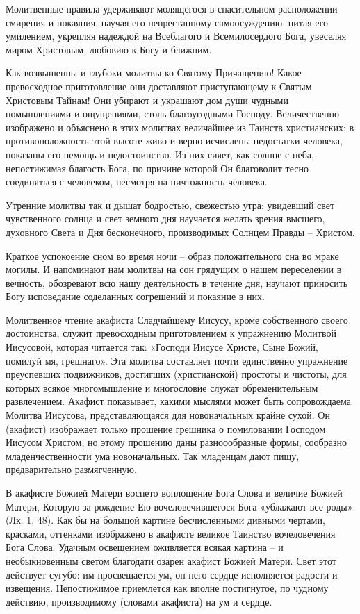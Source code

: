 Молитвенные правила удерживают молящегося в спасительном расположении смирения и покаяния, научая его непрестанному самоосуждению, питая его умилением, укрепляя надеждой на Всеблагого и Всемилосердого Бога, увеселяя миром Христовым, любовию к Богу и ближним.

Как возвышенны и глубоки молитвы ко Святому Причащению! Какое превосходное приготовление они доставляют приступающему к Святым Христовым Тайнам! Они убирают и украшают дом души чудными помышлениями и ощущениями, столь благоугодными Господу. Величественно изображено и объяснено в этих молитвах величайшее из Таинств христианских; в противоположность этой высоте живо и верно исчислены недостатки человека, показаны его немощь и недостоинство. Из них сияет, как солнце с неба, непостижимая благость Бога, по причине которой Он благоволит тесно соединяться с человеком, несмотря на ничтожность человека.

Утренние молитвы так и дышат бодростью, свежестью утра: увидевший свет чувственного солнца и свет земного дня научается желать зрения высшего, духовного Света и Дня бесконечного, производимых Солнцем Правды – Христом.

Краткое успокоение сном во время ночи – образ положительного сна во мраке могилы. И напоминают нам молитвы на сон грядущим о нашем переселении в вечность, обозревают всю нашу деятельность в течение дня, научают приносить Богу исповедание соделанных согрешений и покаяние в них.

Молитвенное чтение акафиста Сладчайшему Иисусу, кроме собственного своего достоинства, служит превосходным приготовлением к упражнению Молитвой Иисусовой, которая читается так: «Господи Иисусе Христе, Сыне Божий, помилуй мя, грешнаго». Эта молитва составляет почти единственно упражнение преуспевших подвижников, достигших (христианской) простоты и чистоты, для которых всякое многомышление и многословие служат обременительным развлечением. Акафист показывает, какими мыслями может быть сопровождаема Молитва Иисусова, представляющаяся для новоначальных крайне сухой. Он (акафист) изображает только прошение грешника о помиловании Господом Иисусом Христом, но этому прошению даны разноообразные формы, сообразно младенчественности ума новоначальных. Так младенцам дают пищу, предварительно размягченную.

В акафисте Божией Матери воспето воплощение Бога Слова и величие Божией Матери, Которую за рождение Ею вочеловечившегося Бога «ублажают все роды» (Лк. 1, 48). Как бы на большой картине бесчисленными дивными чертами, красками, оттенками изображено в акафисте великое Таинство вочеловечения Бога Слова. Удачным освещением оживляется всякая картина – и необыкновенным светом благодати озарен акафист Божией Матери. Свет этот действует сугубо: им просвещается ум, он него сердце исполняется радости и извещения. Непостижимое приемлется как вполне постигнутое, по чудному действию, производимому (словами акафиста) на ум и сердце.

